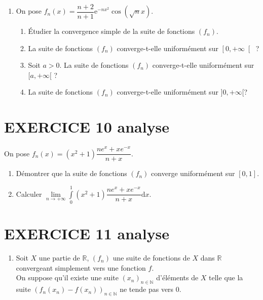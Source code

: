 \documentclass[10pt,oneside]{article}
\begin{document}
\begin{flushleft}
\begin{enumerate}
  \item   
On pose $f_{n}(x) =\dfrac{n+2}{n+1}\mathrm{e}^{-n x^{2}}\cos \left( \sqrt{n}x\right) $.
\begin{enumerate}
\item \'Etudier la convergence simple de la suite de fonctions $\left(f_{n}\right) $.
\item     La suite de fonctions  $\left(f_{n}\right)$ converge-t-elle uniformément sur $\left[ 0,+\infty\right[$ ?

\item Soit $a>0$. La suite de fonctions $\left(f_{n}\right) $ converge-t-elle uniform\'{e}ment sur  $[a,+\infty[$ ?	

\item La suite de fonctions  $\left(f_{n}\right)$ converge-t-elle uniform\'{e}ment sur $]0,+\infty[$? 
\end{enumerate}
\end{enumerate}
\section*{EXERCICE 10 \:analyse }

On pose $f_{n}\left( x\right) =\left( x^{2}+1\right) \dfrac{ne^{x}+xe^{-x}}{n+x}$.

\begin{enumerate}
\item Démontrer que la suite de fonctions $\left( f_{n}\right) $ converge uniform\'{e}ment sur $[0,1]$.
\item Calculer $\underset{n\rightarrow +\infty }{\lim }\displaystyle\int\limits_{0}^{1}\left( x^{2}+1\right) \dfrac{ne^{x}+xe^{-x}}{n+x}\text{d}x$.
\end{enumerate}



\section*{EXERCICE 11 \:analyse }

\begin{enumerate}
\item Soit $X$ une partie de $\mathbb{R}$, $\left( f_{n}\right) $ une suite de fonctions de $X$ dans $\mathbb{R}$ convergeant simplement vers une fonction $f$. \\
On suppose qu'il existe une suite $\left( x_{n}\right)_{n\in \mathbb{N}}$ d'\'{e}l\'{e}ments de $X$ telle que la suite $\left( f_{n}(x_{n})-f\left( x_{n}\right) \right) _{n\in \mathbb{N}}$ ne tende pas vers $0$. \bigskip


\end{enumerate}
\end{flushleft}
\end{document}
